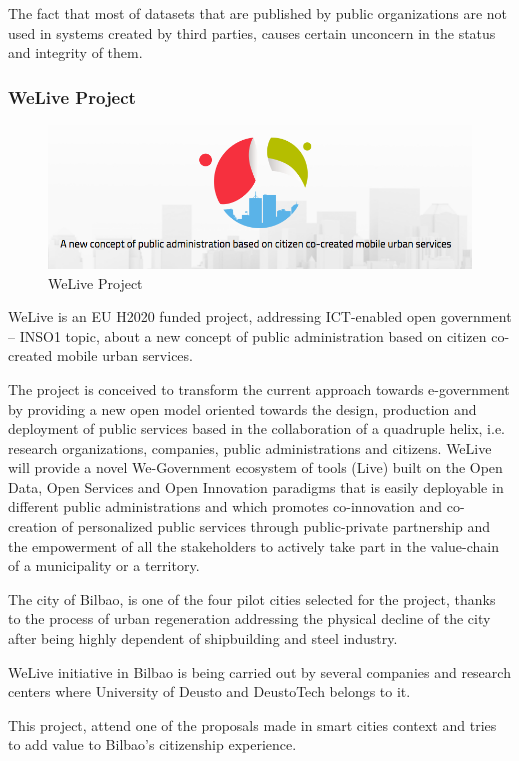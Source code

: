 \documentclass{DeustoFDP}
\begin{document}
The fact that most of datasets that are published by public organizations are not used in systems created by third parties, causes certain unconcern in the status and integrity of them.

\subsubsection{WeLive Project}
\begin{figure}[h]
\centering
\includegraphics[width=0.7\linewidth]{fig/welive}
\caption[WeLive Project]{WeLive Project}
\label{fig:welive}
\end{figure}


WeLive is an EU H2020 funded project, addressing ICT-enabled open government – INSO1 topic, about a new concept of public administration based on citizen co-created mobile urban services.

The project is conceived to transform the current approach towards e-government by providing a new open model oriented towards the design, production and deployment of public services based in the collaboration of a quadruple helix, i.e. research organizations, companies, public administrations and citizens. WeLive will provide a novel We-Government ecosystem of tools (Live) built on the Open Data, Open Services and Open  Innovation paradigms that is easily deployable in different public administrations and which promotes co-innovation and co-creation of personalized public services through public-private partnership and the  empowerment of all the stakeholders to actively take part in the value-chain of a municipality or a territory. \cite{WeLive}

The city of Bilbao, is one of the four pilot cities selected for the project, thanks to the process of urban regeneration addressing the physical decline of the city after being highly dependent of shipbuilding and steel industry.

WeLive initiative in Bilbao is being carried out by several companies and research centers where University of Deusto and DeustoTech belongs to it.

This project, attend one of the proposals made in smart cities context and tries to add value to Bilbao's citizenship experience.
\end{document}
